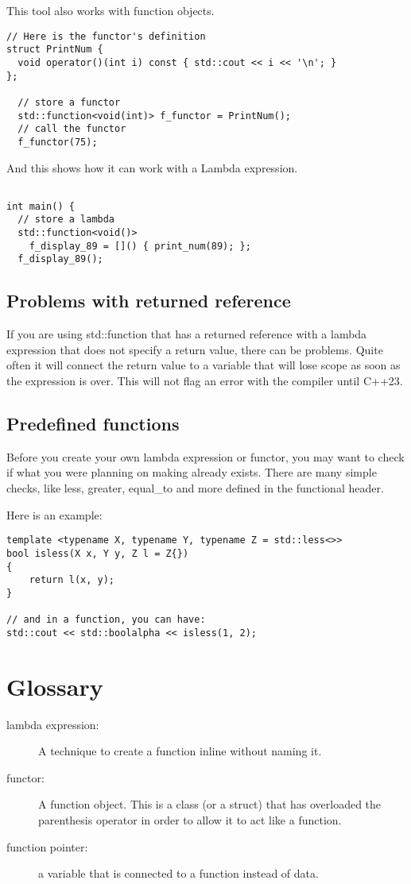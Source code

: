 This tool also works with function objects.
\begin{lstlisting}
// Here is the functor's definition
struct PrintNum {
  void operator()(int i) const { std::cout << i << '\n'; }
};

  // store a functor
  std::function<void(int)> f_functor = PrintNum();
  // call the functor
  f_functor(75);
\end{lstlisting}

And this shows how it can work with a Lambda expression.
\begin{lstlisting}

int main() {
  // store a lambda
  std::function<void()> 
    f_display_89 = []() { print_num(89); };
  f_display_89();

\end{lstlisting}

\subsection{Problems with returned reference}
If you are using std::function that has a returned reference with a lambda expression that does not specify a return value, there can be problems. Quite often it will connect the
return value to a variable that will lose scope as soon as the expression is over. This
will not flag an error with the compiler until C++23.

\subsection{Predefined functions}
Before you create your own lambda expression or functor, you may want to check if what
you were planning on making already exists. There are many simple checks, like less, greater, equal\_to and more defined in the functional header.

Here is an example:
\begin{lstlisting}
template <typename X, typename Y, typename Z = std::less<>>
bool isless(X x, Y y, Z l = Z{})
{
    return l(x, y);
}
 
// and in a function, you can have:
std::cout << std::boolalpha << isless(1, 2);
\end{lstlisting}

\section{Glossary}

\begin{description}
\item[lambda expression:] A technique to create a function inline without naming it.
\item[functor:] A function object. This is a class (or a struct) that has overloaded the parenthesis operator in order to allow it to act like a function.
\item[function pointer:] a variable that is connected to a function instead of data.
\end{description}
